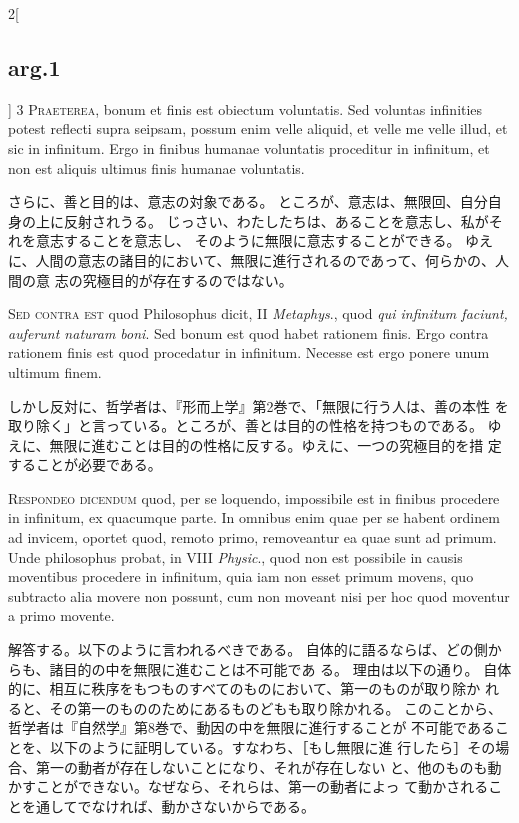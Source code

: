 \documentclass[paper=a4paper,fontsize=10pt,jafontsize=9pt,titlepage]{jlreq}
\begin{document}
\begin{paracol}{2}[\subsection{arg.1}]
{\scshape 3 Praeterea}, bonum et finis est obiectum
voluntatis. Sed voluntas infinities potest reflecti supra seipsam,
possum enim velle aliquid, et velle me velle illud, et sic in
infinitum. Ergo in finibus humanae voluntatis proceditur in infinitum,
et non est aliquis ultimus finis humanae voluntatis.

\switchcolumn

さらに、善と目的は、意志の対象である。
ところが、意志は、無限回、自分自身の上に反射されうる。
じっさい、わたしたちは、あることを意志し、私がそれを意志することを意志し、
 そのように無限に意志することができる。
ゆえに、人間の意志の諸目的において、無限に進行されるのであって、何らかの、人間の意
 志の究極目的が存在するのではない。

\switchcolumn*[\subsection{s.c.}]

{\scshape Sed contra est} quod Philosophus dicit,
II {\itshape Metaphys}., quod {\itshape qui infinitum faciunt, auferunt naturam boni}. Sed
bonum est quod habet rationem finis. Ergo contra rationem finis est quod
procedatur in infinitum. Necesse est ergo ponere unum ultimum finem.

\switchcolumn

しかし反対に、哲学者は、『形而上学』第2巻で、「無限に行う人は、善の本性
 を取り除く」と言っている。ところが、善とは目的の性格を持つものである。
 ゆえに、無限に進むことは目的の性格に反する。ゆえに、一つの究極目的を措
 定することが必要である。


{\scshape Respondeo dicendum} quod, per se loquendo,
impossibile est in finibus procedere in infinitum, ex quacumque
parte. In omnibus enim quae per se habent ordinem ad invicem, oportet
quod, remoto primo, removeantur ea quae sunt ad primum. Unde philosophus
probat, in VIII {\itshape Physic}., quod non est possibile in causis moventibus
procedere in infinitum, quia iam non esset primum movens, quo subtracto
alia movere non possunt, cum non moveant nisi per hoc quod moventur a
primo movente.

\switchcolumn

解答する。以下のように言われるべきである。
自体的に語るならば、どの側からも、諸目的の中を無限に進むことは不可能であ
 る。
理由は以下の通り。
自体的に、相互に秩序をもつものすべてのものにおいて、第一のものが取り除か
 れると、その第一のもののためにあるものどもも取り除かれる。
このことから、哲学者は『自然学』第8巻で、動因の中を無限に進行することが
 不可能であることを、以下のように証明している。すなわち、［もし無限に進
 行したら］その場合、第一の動者が存在しないことになり、それが存在しない
 と、他のものも動かすことができない。なぜなら、それらは、第一の動者によっ
 て動かされることを通してでなければ、動かさないからである。


\end{paracol}
\end{document}
